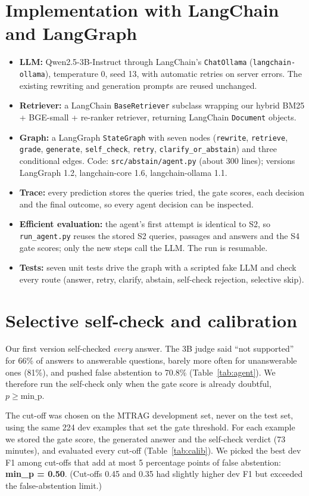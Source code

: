 \documentclass[11pt,a4paper]{report}
\newcommand{\sys}[1]{\textsf{#1}}
\begin{document}
\section{Implementation with LangChain and LangGraph}
\begin{itemize}
\item \textbf{LLM:} Qwen2.5-3B-Instruct through LangChain's \texttt{ChatOllama} (\texttt{langchain-ollama}), temperature 0, seed 13, with automatic retries on server errors. The existing rewriting and generation prompts are reused unchanged.
\item \textbf{Retriever:} a LangChain \texttt{BaseRetriever} subclass wrapping our hybrid BM25 + BGE-small + re-ranker retriever, returning LangChain \texttt{Document} objects.
\item \textbf{Graph:} a LangGraph \texttt{StateGraph} with seven nodes (\texttt{rewrite}, \texttt{retrieve}, \texttt{grade}, \texttt{generate}, \texttt{self\_check}, \texttt{retry}, \texttt{clarify\_or\_abstain}) and three conditional edges. Code: \texttt{src/abstain/agent.py} (about 300 lines); versions LangGraph 1.2, langchain-core 1.6, langchain-ollama 1.1.
\item \textbf{Trace:} every prediction stores the queries tried, the gate scores, each decision and the final outcome, so every agent decision can be inspected.
\item \textbf{Efficient evaluation:} the agent's first attempt is identical to \sys{S2}, so \texttt{run\_agent.py} reuses the stored \sys{S2} queries, passages and answers and the \sys{S4} gate scores; only the new steps call the LLM. The run is resumable.
\item \textbf{Tests:} seven unit tests drive the graph with a scripted fake LLM and check every route (answer, retry, clarify, abstain, self-check rejection, selective skip).
\end{itemize}

\section{Selective self-check and calibration}\label{sec:selective}
Our first version self-checked \emph{every} answer. The 3B judge said ``not supported'' for 66\% of answers to answerable questions, barely more often for unanswerable ones (81\%), and pushed false abstention to 70.8\% (Table~\ref{tab:agent}). We therefore run the self-check only when the gate score is already doubtful, $p \ge \text{min\_p}$.

The cut-off was chosen on the MTRAG development set, never on the test set, using the same 224 dev examples that set the gate threshold. For each example we stored the gate score, the generated answer and the self-check verdict (73 minutes), and evaluated every cut-off (Table~\ref{tab:calib}). We picked the best dev F1 among cut-offs that add at most 5 percentage points of false abstention: \textbf{min\_p = 0.50}. (Cut-offs 0.45 and 0.35 had slightly higher dev F1 but exceeded the false-abstention limit.)
\end{document}
